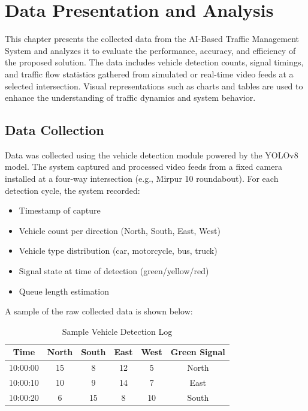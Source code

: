 \chapter{Data Presentation and Analysis}

This chapter presents the collected data from the AI-Based Traffic Management System and analyzes it to evaluate the performance, accuracy, and efficiency of the proposed solution. The data includes vehicle detection counts, signal timings, and traffic flow statistics gathered from simulated or real-time video feeds at a selected intersection. Visual representations such as charts and tables are used to enhance the understanding of traffic dynamics and system behavior.

\section{Data Collection}

Data was collected using the vehicle detection module powered by the YOLOv8 model. The system captured and processed video feeds from a fixed camera installed at a four-way intersection (e.g., Mirpur 10 roundabout). For each detection cycle, the system recorded:

\begin{itemize}
    \item Timestamp of capture
    \item Vehicle count per direction (North, South, East, West)
    \item Vehicle type distribution (car, motorcycle, bus, truck)
    \item Signal state at time of detection (green/yellow/red)
    \item Queue length estimation
\end{itemize}

A sample of the raw collected data is shown below:

\begin{table}[H]
    \centering
    \caption{Sample Vehicle Detection Log}
    \begin{tabular}{|c|c|c|c|c|c|}
        \hline
        \textbf{Time} & \textbf{North} & \textbf{South} & \textbf{East} & \textbf{West} & \textbf{Green Signal} \\
        \hline
        10:00:00 & 15 & 8 & 12 & 5 & North \\
        10:00:10 & 10 & 9 & 14 & 7 & East \\
        10:00:20 & 6  & 15 & 8  & 10 & South \\
        \hline
    \end{tabular}
\end{table}


